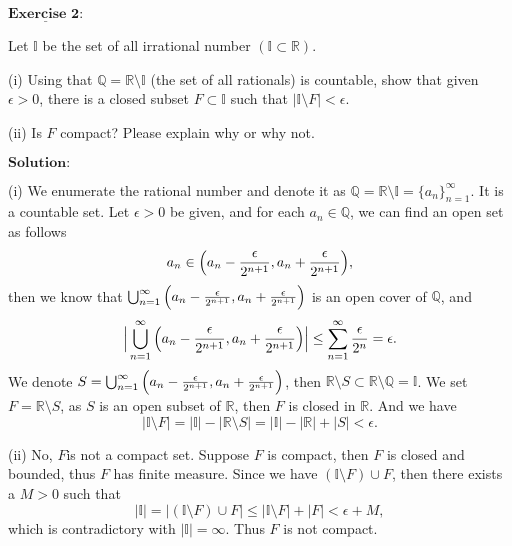 \documentclass[12pt,a4paper]{ctexart}
\begin{document}
\newpage 

$\underline{\textbf{Exercise 2:}}$

Let $\mathbb{I}$ be the set of all irrational number $(\mathbb{I} \subset \mathbb{R})$.

(i) Using that $\mathbb{Q} = \mathbb{R} \setminus \mathbb{I}$ (the set of all rationals) is countable, show that given $\epsilon > 0$, there is a closed subset $F \subset \mathbb{I}$ such that $|\mathbb{I} \setminus F| < \epsilon$.

(ii) Is $F$ compact? Please explain why or why not.
 
\vspace{8pt}
$\textbf{Solution:}$

(i) We enumerate the rational number and denote it as $\mathbb{Q} = \mathbb{R} \setminus \mathbb{I} = \{a_{n}\}_{n=1}^{\infty}$. It is a countable set. Let $\epsilon > 0$ be given, and for each $a_{n} \in \mathbb{Q}$, we can find an open set as follows
\begin{equation*}
    a_{n} \in \Big{(} a_{n} - \frac{\epsilon}{2^{n+1}}, a_{n} + \frac{\epsilon}{2^{n+1}} \Big{)},
\end{equation*}
then we know that $\bigcup_{n=1}^{\infty} \Big{(} a_{n} - \frac{\epsilon}{2^{n+1}}, a_{n} + \frac{\epsilon}{2^{n+1}} \Big{)} $ is an open cover of $\mathbb{Q}$, and
\begin{equation*}
    \Big{|} \bigcup_{n=1}^{\infty} \Big{(} a_{n} - \frac{\epsilon}{2^{n+1}}, a_{n} + \frac{\epsilon}{2^{n+1}} \Big{)} \Big{|} \leq \sum_{n=1}^{\infty} \frac{\epsilon}{2^{n}} = \epsilon.
\end{equation*}
We denote $S = \bigcup_{n=1}^{\infty} \Big{(} a_{n} - \frac{\epsilon}{2^{n+1}}, a_{n} + \frac{\epsilon}{2^{n+1}} \Big{)}$, then $\mathbb{R} \setminus S \subset \mathbb{R} \setminus \mathbb{Q} = \mathbb{I}$. We set $F = \mathbb{R} \setminus S$, as $S$ is an open subset of $\mathbb R$, then $F$ is closed in $\mathbb R$. And we have
\begin{equation*}
    |\mathbb{I} \setminus F| = |\mathbb{I}| - |\mathbb{R} \setminus S| = |\mathbb{I}| - |\mathbb{R} | + |S| < \epsilon.
\end{equation*}

(ii) No, $F$is not a compact set. Suppose $F$ is compact, then $F$ is closed and bounded, thus $F$ has finite measure. Since we have $(\mathbb{I} \setminus F) \cup F$, then there exists a $M > 0$ such that 
\begin{equation*}
    |\mathbb{I}| = |(\mathbb{I} \setminus F) \cup F| \leq |\mathbb{I} \setminus F| + |F| < \epsilon + M,
\end{equation*}
which is contradictory with $|\mathbb{I}| = \infty$. Thus $F$ is not compact.
\end{document}
